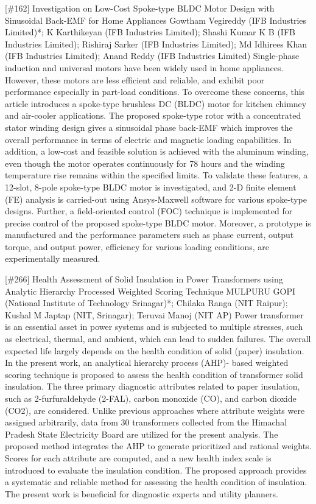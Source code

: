 {} \begin{abstract_online} {[\#162] Investigation on Low-Cost Spoke-type BLDC Motor Design with Sinusoidal Back-EMF for Home Appliances} {} {Gowtham Vegireddy (IFB Industries Limited)*; K Karthikeyan (IFB Industries Limited); Shashi Kumar  K B (IFB Industries Limited); Rishiraj  Sarker (IFB Industries Limited); Md Idhirees  Khan (IFB Industries Limited); Anand Reddy (IFB Industries Limited)} {} Single-phase induction and universal motors have been widely used in home appliances. However, these motors are less efficient and reliable, and exhibit poor performance especially in part-load conditions. To overcome these concerns, this article introduces a spoke-type brushless DC (BLDC) motor for kitchen chimney and air-cooler applications. The proposed spoke-type rotor with a concentrated stator winding design gives a sinusoidal phase back-EMF which improves the overall performance in terms of electric and magnetic loading capabilities. In addition, a low-cost and feasible solution is achieved with the aluminum winding, even though the motor operates continuously for 78 hours and the winding temperature rise remains within the specified limits. To validate these features, a 12-slot, 8-pole spoke-type BLDC motor is investigated, and 2-D finite element (FE) analysis is carried-out using Ansys-Maxwell software for various spoke-type designs. Further, a field-oriented control (FOC) technique is implemented for precise control of the proposed spoke-type BLDC motor. Moreover, a prototype is manufactured and the performance parameters such as phase current, output torque, and output power, efficiency for various loading conditions, are experimentally measured. \end{abstract_online} 
{} \begin{abstract_online} {[\#266] Health Assessment of Solid Insulation in Power Transformers using Analytic Hierarchy Processed Weighted Scoring Technique} {} {MULPURU GOPI (National Institute of Technology Srinagar)*; Chilaka  Ranga (NIT Raipur); Kushal M  Japtap (NIT, Srinagar); Teruvai  Manoj (NIT AP)} {} Power transformer is an essential asset in power systems and is subjected to multiple stresses, such as electrical, thermal, and ambient, which can lead to sudden failures. The overall expected life largely depends on the health condition of solid (paper) insulation. In the present work, an analytical hierarchy process (AHP)- based weighted scoring technique is proposed to assess the health condition of transformer solid insulation. The three primary diagnostic attributes related to paper insulation, such as 2-furfuraldehyde (2-FAL), carbon monoxide (CO), and carbon dioxide (CO2), are considered. Unlike previous approaches where attribute weights were assigned arbitrarily, data from 30 transformers collected from the Himachal Pradesh State Electricity Board are utilized for the present analysis. The proposed method integrates the AHP to generate prioritized and rational weights. Scores for each attribute are computed, and a new health index scale is introduced to evaluate the insulation condition. The proposed approach provides a systematic and reliable method for assessing the health condition of insulation. The present work is beneficial for diagnostic experts and utility planners. \end{abstract_online} 
